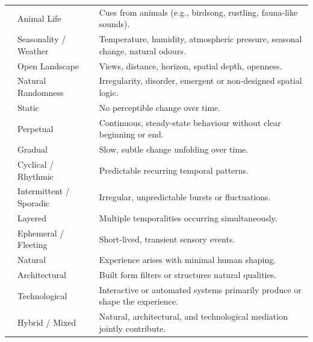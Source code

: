 \begin{table}[!ht]
\begin{tabular}{@{}
  >{\centering\arraybackslash}p{}
  p{}
  p{}
@{}}
& Animal Life & Cues from animals (e.g., birdsong, rustling, fauna-like sounds). \\
& Seasonality / Weather & Temperature, humidity, atmospheric pressure, seasonal change, natural odours. \\
& Open Landscape & Views, distance, horizon, spatial depth, openness. \\
& Natural Randomness & Irregularity, disorder, emergent or non-designed spatial logic. \\
\midrule
\multirow{7}{*}{\textbf{Temporal Behaviour}} & Static & No perceptible change over time. \\
& Perpetual & Continuous, steady-state behaviour without clear beginning or end. \\
& Gradual & Slow, subtle change unfolding over time. \\
& Cyclical / Rhythmic & Predictable recurring temporal patterns. \\
& Intermittent / Sporadic & Irregular, unpredictable bursts or fluctuations. \\
& Layered & Multiple temporalities occurring simultaneously. \\
& Ephemeral / Fleeting & Short-lived, transient sensory events. \\
\midrule
\multirow{4}{*}{\textbf{Level of Mediation}} & Natural & Experience arises with minimal human shaping. \\
& Architectural & Built form filters or structures natural qualities. \\
& Technological & Interactive or automated systems primarily produce or shape the experience. \\
& Hybrid / Mixed & Natural, architectural, and technological mediation jointly contribute. \\
\bottomrule
\end{tabular}
\end{table}


